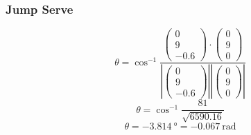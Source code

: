 \documentclass{article}
\begin{document}
												\subsubsection*{Jump Serve}

												\[\theta = \cos^{-1} \frac{\begin{pmatrix} 0 \\ 9 \\ -0.6 \end{pmatrix} \cdot \begin{pmatrix} 0 \\ 9 \\ 0 \end{pmatrix}}{ \left| \begin{pmatrix} 0 \\ 9 \\ -0.6 \end{pmatrix} \right| \left| \begin{pmatrix} 0 \\ 9 \\ 0 \end{pmatrix} \right| }\]
												\[\theta = \cos^{-1} \frac{81}{\sqrt{6590.16}}\]
												\[\theta = \SI{-3.814}{\degree} = \SI{-0.067}{\radian}\]
\end{document}
